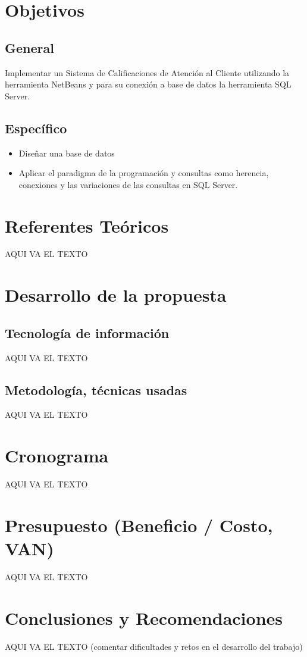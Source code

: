 \documentclass[preprint,12pt]{elsarticle}
\begin{document}
\section{Objetivos}
	\subsection{General }	
		Implementar un Sistema de Calificaciones de Atención al Cliente utilizando la herramienta NetBeans y para su conexión a base de datos la herramienta SQL Server.
	\subsection{Específico }	

\begin{itemize}
	\item Diseñar una base de datos
	\item Aplicar el paradigma  de la programación y consultas como herencia, conexiones y las variaciones de las consultas en SQL Server.
\end{itemize}


\section{Referentes Teóricos}
AQUI VA EL TEXTO

\section{Desarrollo de la propuesta}
	\subsection{Tecnología de información }	
		AQUI VA EL TEXTO
	\subsection{Metodología, técnicas usadas }	
		AQUI VA EL TEXTO

\section{Cronograma}
AQUI VA EL TEXTO
	
\section{Presupuesto (Beneficio / Costo, VAN)}
AQUI VA EL TEXTO

\section{Conclusiones y Recomendaciones }
AQUI VA EL TEXTO
(comentar dificultades y retos en el desarrollo del trabajo)



	
	\newpage
	


	
\end{document}
